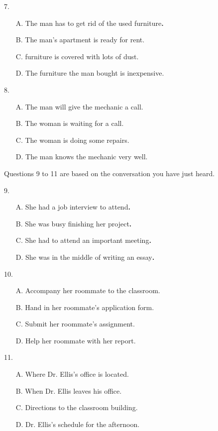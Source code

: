 \documentclass[UTF8,11pt]{ctexart}
\begin{document}
7.


\begin{itemize}[leftmargin=2em,itemsep=.2em,topsep=.4em]\item[A.] The man has to get rid of the used furniture\textbf{.}
\item[B.] The man’s apartment is ready for rent.
\item[C.] furniture is covered with lots of dust.
\item[D.] The furniture the man bought is inexpensive.
\end{itemize}

8.


\begin{itemize}[leftmargin=2em,itemsep=.2em,topsep=.4em]\item[A.] The man will give the mechanic a call.
\item[B.] The woman is waiting for a call.
\item[C.] The woman is doing some repairs.
\item[D.] The man knows the mechanic very well.
\end{itemize}

Questions 9 to 11 are based on the conversation you have just heard.


9.


\begin{itemize}[leftmargin=2em,itemsep=.2em,topsep=.4em]\item[A.] She had a job interview to attend\textbf{.}
\item[B.] She was busy finishing her project\textbf{.}
\item[C.] She had to attend an important meeting\textbf{.}
\item[D.] She was in the middle of writing an essay\textbf{.}
\end{itemize}

10.


\begin{itemize}[leftmargin=2em,itemsep=.2em,topsep=.4em]\item[A.] Accompany her roommate to the classroom.
\item[B.] Hand in her roommate’s application form.
\item[C.] Submit her roommate’s assignment.
\item[D.] Help her roommate with her report.
\end{itemize}

11.


\begin{itemize}[leftmargin=2em,itemsep=.2em,topsep=.4em]\item[A.] Where Dr. Ellis’s office is located.
\item[B.] When Dr. Ellis leaves his office.
\item[C.] Directions to the classroom building.
\item[D.] Dr. Ellis’s schedule for the afternoon.
\end{itemize}
\end{document}
